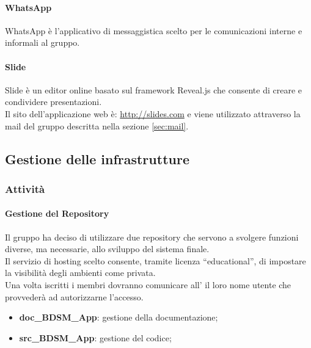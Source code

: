 			\paragraph{WhatsApp}
			WhatsApp è l'applicativo di messaggistica scelto per le comunicazioni interne e informali al gruppo.
			\paragraph{Slide}
			Slide è un editor online basato sul framework\gloss{} Reveal.js\gloss{} che consente di creare e condividere presentazioni. \\
			Il sito dell'applicazione web è: \url{http://slides.com} e viene utilizzato attraverso la mail del gruppo descritta nella sezione \ref{sec:mail}.


	\subsection{Gestione delle infrastrutture}
	
		\subsubsection{Attività}
			\paragraph{Gestione del Repository}
			Il gruppo ha deciso di utilizzare due repository\gloss{} che servono a svolgere funzioni diverse, ma necessarie, allo sviluppo del sistema finale. \\
			Il servizio di hosting scelto consente, tramite licenza ``educational'', di impostare la visibilità degli ambienti come privata. \\
			Una volta iscritti i membri dovranno comunicare all'\roleAdministrator{} il loro nome utente che provvederà ad autorizzarne l'accesso.
				\begin{itemize}
					\item \textbf{doc\_BDSM\_App}: gestione della documentazione;
					\item \textbf{src\_BDSM\_App}: gestione del codice;
				\end{itemize}
